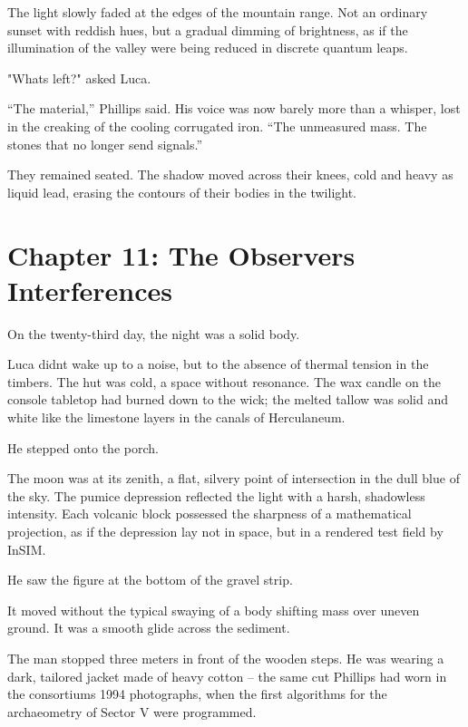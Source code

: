 \documentclass[
  ngerman,
]{article}
\begin{document}
The light slowly faded at the edges of the mountain range. Not an
ordinary sunset with reddish hues, but a gradual dimming of brightness,
as if the illumination of the valley were being reduced in discrete
quantum leaps.

"What\textquotesingle s left?" asked Luca.

``The material,'' Phillips said. His voice was now barely more than a
whisper, lost in the creaking of the cooling corrugated iron. ``The
unmeasured mass. The stones that no longer send signals.''

They remained seated. The shadow moved across their knees, cold and
heavy as liquid lead, erasing the contours of their bodies in the
twilight.

\section{}\label{section-4}

\section{\texorpdfstring{\textbf{Chapter 11: The
Observer\textquotesingle s
Interferences}}{Chapter 11: The Observer\textquotesingle s Interferences}}\label{chapter-11-the-observers-interferences}

On the twenty-third day, the night was a solid body.

Luca didn\textquotesingle t wake up to a noise, but to the absence of
thermal tension in the timbers. The hut was cold, a space without
resonance. The wax candle on the console tabletop had burned down to the
wick; the melted tallow was solid and white like the limestone layers in
the canals of Herculaneum.

He stepped onto the porch.

The moon was at its zenith, a flat, silvery point of intersection in the
dull blue of the sky. The pumice depression reflected the light with a
harsh, shadowless intensity. Each volcanic block possessed the sharpness
of a mathematical projection, as if the depression lay not in space, but
in a rendered test field by InSIM.

He saw the figure at the bottom of the gravel strip.

It moved without the typical swaying of a body shifting mass over uneven
ground. It was a smooth glide across the sediment.

The man stopped three meters in front of the wooden steps. He was
wearing a dark, tailored jacket made of heavy cotton -- the same cut
Phillips had worn in the consortium\textquotesingle s 1994 photographs,
when the first algorithms for the archaeometry of Sector V were
programmed.
\end{document}
